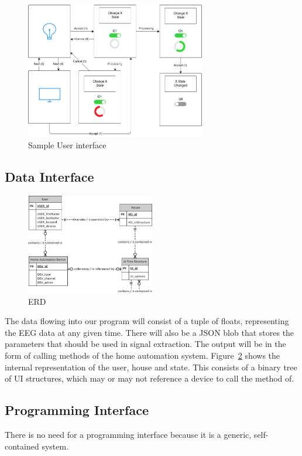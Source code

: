 \documentclass{article}
\begin{document}
\begin{figure}[h!]
	
  \centering
    \includegraphics[width=0.7\textwidth]{UI_Mockup}
   \caption{Sample User interface}
   \label{fig:ui}
\end{figure}

\subsection{Data Interface}
\begin{figure}[h!]

  \centering
    \includegraphics[width=0.5\textwidth]{ERD}
   \caption{ERD}
   	\label{fig:erd}
\end{figure}

The data flowing into our program will consist of a tuple of floats,
representing the EEG data at any given time. There will also be a JSON blob
that stores the parameters that should be used in signal extraction. The
output will be in the form of calling methods of the home automation system.
Figure~\ref{fig:erd} shows the internal representation of the user, house and
state. This consists of a binary tree of UI structures, which may or may not
reference a device to call the method of.

\subsection{Programming Interface} 
There is no need for a programming interface because it is a generic, self-contained system.
\end{document}
